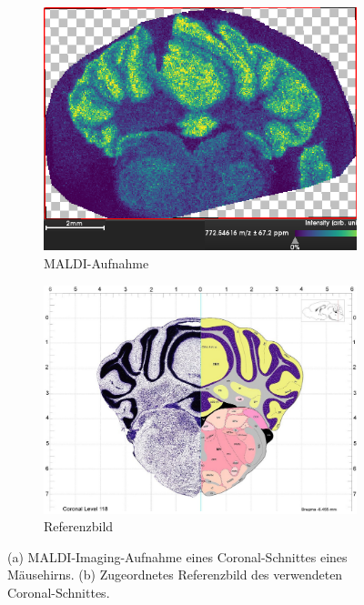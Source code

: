 \begin{figure}[!ht]
    \centering
    \begin{subfigure}{0.65\textwidth}
        \centering
        \includegraphics[width=1\textwidth]{raw/hirn/Hirn772_crop}
        \caption{MALDI-Aufnahme}
        \label{fig:hirn1}
    \end{subfigure}
    \begin{subfigure}{0.65\textwidth}
        \centering
        \includegraphics[width=1\textwidth]{img/coronal_ref}
        \caption{Referenzbild}
        \label{fig:hirn-ref}
    \end{subfigure}
    \caption{(a) MALDI-Imaging-Aufnahme eines Coronal-Schnittes eines Mäusehirns. (b) Zugeordnetes Referenzbild des verwendeten Coronal-Schnittes. \cite{mouse-brain-map}}
    \label{fig:hirn-vgl}
\end{figure}

